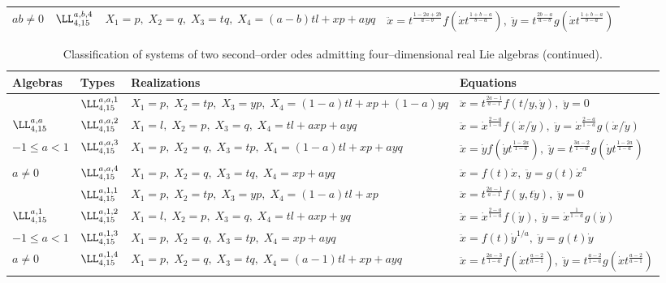 \begin{landscape}
\begin{table}
\begin{center}
\begin{tabular}{|l|l|l|l|}
\cline{2-4}
$ab\ne 0$ & $\LL_{4,15}^{a,b,4}$ & $X_1=p,\;X_2=q,\;X_3=tq,\;
X_4=(a-b)tl+xp+ayq$ &
$\ddot x=t^{\frac{1-2a+2b}{a-b}}f(\dot x t^{\frac{1+b-a}{b-a}}),\;
\ddot y=t^{\frac{2b-a}{a-b}}g(\dot x t^{\frac{1+b-a}{b-a}})$ \\
\hline
\end{tabular}                       
\end{center}
\end{table}
\setcounter{table}{2}
\begin{table}
\label{ta7}
\begin{center}
\caption{Classification of systems of two second--order odes admitting
four--dimensional real Lie algebras (continued).}
\vspace{10mm}
\begin{tabular}{|l|l|l|l|}
\hline
Algebras & Types & Realizations & Equations\\
\hline
& $\LL_{4,15}^{a,a,1}$& $X_1=p,\;X_2=tp,\;X_3=yp,\;X_4=(1-a)tl+xp+(1-a)yq$&
$\ddot x=t^{\frac{2a-1}{a-1}}f(t/y,\dot y),\;\ddot y=0$\\
\cline{2-4}
$\LL_{4,15}^{a,a}$ & $\LL_{4,15}^{a,a,2}$ & $X_1=l,\;X_2=p,\;X_3=q,\;
X_4=tl+axp+ayq$ & $\ddot x=\dot x^{\frac{2-a}{1-a}}f(\dot x /\dot y)
,\;\ddot y= \dot x^{\frac{2-a}{1-a}}g(\dot x/ \dot y)
$\\
\cline{2-4}
$-1\le a <1$ &$\LL_{4,15}^{a,a,3}$ & $X_1=p,\;X_2=q,\;X_3=tp,\;
X_4=(1-a)tl+xp+ayq$ & 
$\ddot x=\dot yf(\dot y t^{\frac{1-2a}{1-a}}),\;
\ddot y=t^{\frac{3a-2}{1-a}}g(\dot y t^{\frac{1-2a}{1-a}}) $ \\ 
\cline{2-4}
$a\ne 0$ & $\LL_{4,15}^{a,a,4}$ & $X_1=p,\;X_2=q,\;X_3=tq,\;
X_4=xp+ayq$ &
$\ddot x=f(t)\dot x,\;\ddot y=g(t)\dot x ^a$ \\
\hline
& $\LL_{4,15}^{a,1,1}$& $X_1=p,\;X_2=tp,\;X_3=yp,\;X_4=(1-a)tl+xp$&
$\ddot x=t^{\frac{2a-1}{a-1}}f(y,t\dot y)
,\;\ddot y=0$\\
\cline{2-4}
$\LL_{4,15}^{a,1}$ & $\LL_{4,15}^{a,1,2}$ & $X_1=l,\;X_2=p,\;X_3=q,\;
X_4=tl+axp+yq$ & $\ddot x=\dot x^{\frac{2-a}{1-a}}f(\dot y),\;
\ddot y= \dot x^{\frac{1}{1-a}}g(\dot y)
$\\
\cline{2-4}
$-1\le a<1$ &$\LL_{4,15}^{a,1,3}$ & $X_1=p,\;X_2=q,\;X_3=tp,\;
X_4=xp+ayq$ & 
$\ddot x=f(t)\dot y^{1/a},\; \ddot y=g(t)\dot y $ \\ 
\cline{2-4}
$a\ne 0$ & $\LL_{4,15}^{a,1,4}$ & $X_1=p,\;X_2=q,\;X_3=tq,\;
X_4=(a-1)tl+xp+ayq$ &
$\ddot x=t^{\frac{2a-3}{1-a}}f(\dot x t^{\frac{a-2}{a-1}}),\;
\ddot y=t^{\frac{a-2}{1-a}}g(\dot x t^{\frac{a-2}{a-1}})$ \\
\hline
\end{tabular}                       
\end{center}
\end{table}
\setcounter{table}{2}


\end{landscape}
